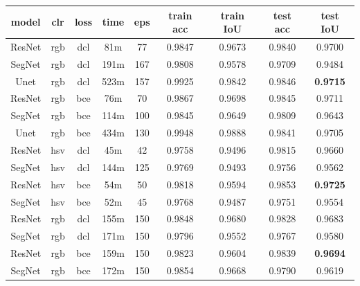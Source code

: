 \newpage
\begin{table}[h!]
	\centering
	\begin{tabular}{|c||c|c|c|c|c|c|c|c|} 
		\hline
		model & clr & loss & time & eps & train acc & train IoU & test acc & test IoU \\
		\hline
		ResNet & rgb & dcl & 81m & 77 & 0.9847 & 0.9673 & 0.9840 & 0.9700 \\
		SegNet & rgb & dcl & 191m & 167 & 0.9808 & 0.9578 & 0.9709 & 0.9484 \\
		Unet & rgb & dcl & 523m & 157 & 0.9925 & 0.9842 & 0.9846 & \textbf{0.9715} \\
		ResNet & rgb & bce & 76m & 70 & 0.9867 & 0.9698 & 0.9845 & 0.9711 \\
        SegNet & rgb & bce & 114m & 100 & 0.9845 & 0.9649 & 0.9809 & 0.9643 \\
        Unet & rgb & bce & 434m & 130 & 0.9948 & 0.9888 & 0.9841 & 0.9705\\
        \hline
        ResNet & hsv & dcl & 45m & 42 & 0.9758 & 0.9496 & 0.9815 & 0.9660 \\
        SegNet & hsv & dcl & 144m & 125 & 0.9769 & 0.9493 & 0.9756 & 0.9562 \\
        ResNet & hsv & bce & 54m & 50 & 0.9818 & 0.9594 & 0.9853 & \textbf{0.9725} \\
        SegNet & hsv & bce & 52m & 45 & 0.9768 & 0.9487 & 0.9751 & 0.9554 \\
        \hline
        ResNet & rgb & dcl & 155m & 150 & 0.9848 & 0.9680 & 0.9828 & 0.9683 \\
        SegNet & rgb & dcl & 171m & 150 & 0.9796 & 0.9552 & 0.9767 & 0.9580 \\
        ResNet & rgb & bce & 159m & 150 & 0.9823 & 0.9604 & 0.9839 & \textbf{0.9694} \\
        SegNet & rgb & bce & 172m & 150 & 0.9854 & 0.9668 & 0.9790 & 0.9619 \\
		\hline
	\end{tabular}

	\bigskip


\end{table}
